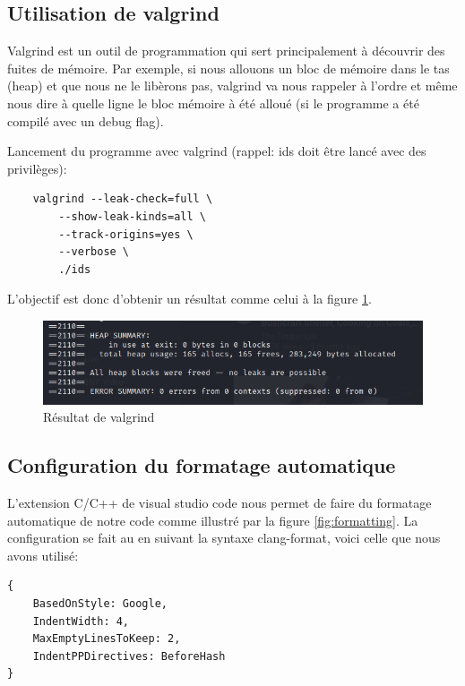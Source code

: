 \documentclass[a4paper]{article}
\begin{document}
\subsection{Utilisation de valgrind}



Valgrind est un outil de programmation qui sert principalement à découvrir des fuites de mémoire. Par exemple, si nous allouons un bloc de mémoire dans le tas (heap) et que nous ne le libèrons pas, valgrind va nous rappeler à l'ordre et même nous dire à quelle ligne le bloc mémoire à été alloué (si le programme a été compilé avec un debug flag).

Lancement du programme avec valgrind (rappel: ids doit être lancé avec des privilèges):
{\small \begin{verbatim}
    valgrind --leak-check=full \
        --show-leak-kinds=all \
        --track-origins=yes \
        --verbose \
        ./ids
\end{verbatim}}

L'objectif est donc d'obtenir un résultat comme celui à la figure \ref{fig:valgrind}.

\begin{figure}[H]
    \centering
    \includegraphics[width=0.75\linewidth]{../markdown-explanations/images/valgrind-01.PNG}
    \caption{Résultat de valgrind}
    \label{fig:valgrind}
\end{figure}





\subsection{Configuration du formatage automatique}



L'extension C/C++ de visual studio code nous permet de faire du formatage automatique de notre code comme illustré par la figure \ref{fig:formatting}. La configuration se fait au en suivant la syntaxe clang-format, voici celle que nous avons utilisé:

{\small\begin{verbatim}
{
    BasedOnStyle: Google,
    IndentWidth: 4,
    MaxEmptyLinesToKeep: 2,
    IndentPPDirectives: BeforeHash
}
\end{verbatim}}
\end{document}
